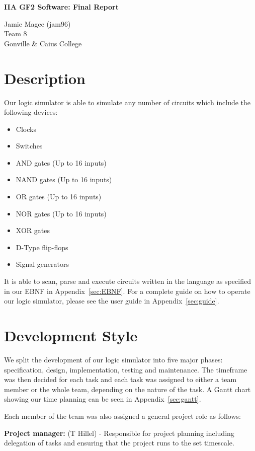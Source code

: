 \documentclass[a4paper,10pt]{article}
\begin{document}
\begin{center}
\Huge \textbf{IIA GF2 Software: Final Report}

\large Jamie Magee (jam96) \\ Team 8 \\ Gonville \& Caius College
\end{center}

\tableofcontents
\pagebreak

\section{Description}
Our logic simulator is able to simulate any number of circuits which include the following devices:

\begin{itemize}
\item Clocks
\item Switches
\item AND gates (Up to 16 inputs)
\item NAND gates (Up to 16 inputs)
\item OR gates (Up to 16 inputs)
\item NOR gates (Up to 16 inputs)
\item XOR gates
\item D-Type flip-flops
\item Signal generators
\end{itemize}

It is able to scan, parse and execute circuits written in the language as specified in our EBNF in Appendix~\ref{sec:EBNF}. For a complete guide on how to operate our logic simulator, please see the user guide in Appendix~\ref{sec:guide}.

\section{Development Style}

We split the development of our logic simulator into five major phases: specification, design, implementation, testing and maintenance. The timeframe was then decided for each task and each task was assigned to either a team member or the whole team, depending on the nature of the task. A Gantt chart showing our time planning can be seen in Appendix~\ref{sec:gantt}.

Each member of the team was also assigned a general project role as follows:

\textbf{Project manager:} (T Hillel) - Responsible for project planning including delegation of tasks and ensuring that the project runs to the set timescale.
\end{document}
